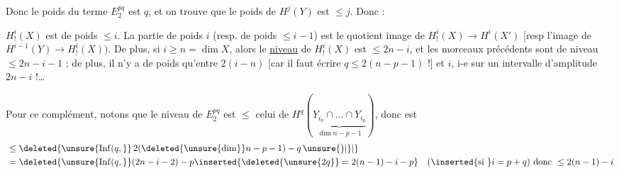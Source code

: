 Donc le poids du terme $E^{pq}_2$ est $q$, et on trouve que le poids de $H^j(Y)$ est $\le j$. Donc :

  $H^i_!(X)$ est de poids  $\le i$. La partie de poids $i$ (resp. de poids $\le i-1$) est le quotient image de $H^i_!(X)\to H^i(X')$ [resp l'image de $H^{i-1}(Y)\to H^i_!(X))$. De plus, si $i\ge n=\dim X$, alors le \uline{niveau} de $H^i_!(X)$ est $\le 2n-i$, et les  morceaux précédents sont de niveau $\le 2n-i-1$ ; de plus, il n'y a de poids qu'entre $2(i-n)$ [car il faut écrire $q\le 2(n-p-1)$ !] et $i$, i-e sur un intervalle d'amplitude $2n-i$ !\ldots


Pour ce complément, notons que le niveau de $E^{pq}_2$ est $\le$ celui de $H^q(\underbrace{Y_{i_0}\cap\ldots\cap Y_{i_p}}_{\dim n-p-1})$, donc est
\[
\begin{aligned}
 {}\le{}&\deleted{\unsure{\operatorname{Inf}(q,}}\,2(\deleted{\unsure{\dim}}n-p-1)-q\,\unsure{\bigr)|\}|{}}\\
 ={}&\deleted{\unsure{\operatorname{Inf}(q,}}(2n-i-2)-p
 \inserted{\deleted{\unsure{2q}}=2(n-1)-i-p}
 \quad(\inserted{\text{si }}i=p+q)\ \text{donc }\le 2(n-1)-i
\end{aligned}
\]
